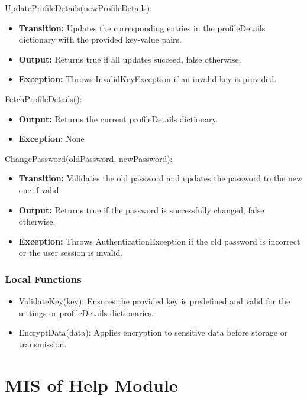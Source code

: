\documentclass[12pt, titlepage]{article}
\begin{document}
\noindent UpdateProfileDetails(newProfileDetails):
\begin{itemize}
  \item \textbf{Transition:} Updates the corresponding entries in the profileDetails dictionary with the provided key-value pairs.
  \item \textbf{Output:} Returns true if all updates succeed, false otherwise.
  \item \textbf{Exception:} Throws InvalidKeyException if an invalid key is provided.
\end{itemize}

\noindent FetchProfileDetails():
\begin{itemize}
  \item \textbf{Output:} Returns the current profileDetails dictionary.
  \item \textbf{Exception:} None
\end{itemize}

\noindent ChangePassword(oldPassword, newPassword):
\begin{itemize}
  \item \textbf{Transition:} Validates the old password and updates the password to the new one if valid.
  \item \textbf{Output:} Returns true if the password is successfully changed, false otherwise.
  \item \textbf{Exception:} Throws AuthenticationException if the old password is incorrect or the user session is invalid.
\end{itemize}

\subsubsection{Local Functions}

\begin{itemize}
  \item ValidateKey(key): Ensures the provided key is predefined and valid for the settings or profileDetails dictionaries.
  \item EncryptData(data): Applies encryption to sensitive data before storage or transmission.
\end{itemize}


\newpage


\section{MIS of Help Module} \label{Module_Help}
\end{document}
